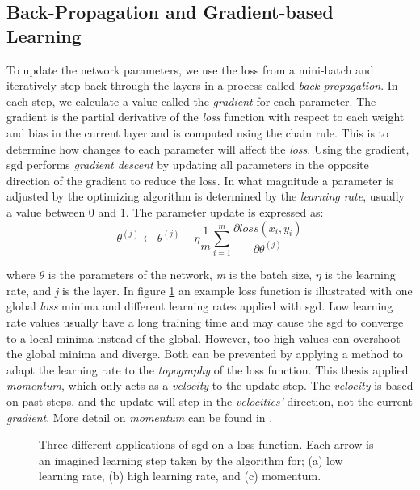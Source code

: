 \subsection{Back-Propagation and Gradient-based Learning}\label{backpropagation}
    To update the network parameters, we use the loss from a mini-batch and iteratively step back through the layers in a process called \textit{back-propagation}\cite{rumelhart1986learning_backprop}. In each step, we calculate a value called the \textit{gradient} for each parameter. The gradient is the partial derivative of the \textit{loss} function with respect to each weight and bias in the current layer and is computed using the chain rule. This is to determine how changes to each parameter will affect the \textit{loss}. Using the gradient, \gls{sgd} performs \textit{gradient descent}\cite{Goodfellow-et-al-2016} by updating all parameters in the opposite direction of the gradient to reduce the loss. In what magnitude a parameter is adjusted by the optimizing algorithm is determined by the \textit{learning rate}, usually a value between 0 and 1. The parameter update is expressed as\cite{pmlr-v37-ioffe15_batch_norm}:
    \begin{equation}
    \theta^{(j)} \leftarrow \theta^{(j)} - \eta \dfrac{1}{m}\sum_{i=1}^{m} \dfrac{\partial loss (x_i,y_i)}{\partial \theta^{(j)}}
    \end{equation}
    
    where $\theta$ is the parameters of the network, \textit{m} is the batch size, $\eta$ is the learning rate, and \textit{j} is the layer. In figure \ref{learning_rates} an example loss function is illustrated with one global \textit{loss} minima and different learning rates applied with \gls{sgd}. Low learning rate values usually have a long training time and may cause the \gls{sgd} to converge to a local minima instead of the global\cite{farsal2018deep}. However, too high values can overshoot the global minima and diverge. Both can be prevented by applying a method to adapt the learning rate to the \textit{topography} of the loss function. This thesis applied \textit{momentum}, which only acts as a \textit{velocity} to the update step. The \textit{velocity} is based on past steps, and the update will step in the \textit{velocities'} direction, not the current \textit{gradient}. More detail on \textit{momentum} can be found in \citeauthor{pmlr-v28-sutskever13}\cite{pmlr-v28-sutskever13}.
    
    \begin{figure}[H]
        \centering

        
        \caption[Learning rates]{Three different applications of \gls{sgd} on a loss function. Each arrow is an imagined learning step taken by the algorithm for; (a) low learning rate, (b) high learning rate, and (c) momentum.}
      	\medskip 
        \label{learning_rates}
    \end{figure}


